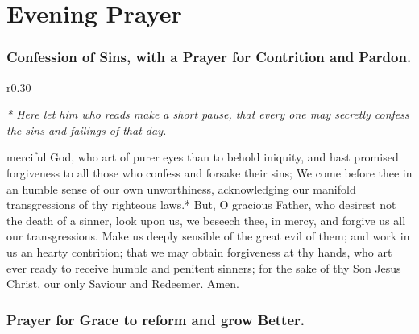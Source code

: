 \theGrace
 
 

\section{Evening Prayer}

\ourFather

\centerline{}


\subsubsection{Confession of Sins, with a Prayer for Contrition and Pardon.}
\begin{wrapfigure}{r}{0.30\textwidth}
\par{\footnotesize\red\emph{* Here let him who reads make a short pause, that every one may secretly confess the sins and failings of that day.}\par}
\end{wrapfigure}
 merciful God, who art of purer eyes than to behold iniquity, and hast promised forgiveness to all those who confess and forsake their sins; We come before thee in an humble sense of our own unworthiness, acknowledging our manifold transgressions of thy righteous laws.* But, O gracious Father, who desirest not the death of a sinner, look upon us, we beseech thee, in mercy, and forgive us all our transgressions. Make us deeply sensible of the great evil of them; and work in us an hearty contrition; that we may obtain forgiveness at thy hands, who art ever ready to receive humble and penitent sinners; for the sake of thy Son Jesus Christ, our only Saviour and Redeemer. Amen.


\subsubsection{Prayer for Grace to reform and grow Better.}


